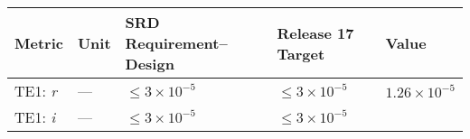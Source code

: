 \documentclass[DM,toc]{lsstdoc}
\begin{document}
\begin{longtable}[]{@{}lllll@{}}
\toprule
\begin{minipage}[b]{0.13\columnwidth}\raggedright\strut
Metric\strut
\end{minipage} & \begin{minipage}[b]{0.05\columnwidth}\raggedright\strut
Unit\strut
\end{minipage} & \begin{minipage}[b]{0.24\columnwidth}\raggedright\strut
SRD Requirement--Design\strut
\end{minipage} & \begin{minipage}[b]{0.21\columnwidth}\raggedright\strut
Release 17 Target\strut
\end{minipage} & \begin{minipage}[b]{0.22\columnwidth}\raggedright\strut
Value\strut
\end{minipage}\tabularnewline
\midrule
\endhead
\begin{minipage}[t]{0.13\columnwidth}\raggedright\strut
TE1: \emph{r}\strut
\end{minipage} & \begin{minipage}[t]{0.05\columnwidth}\raggedright\strut
---\strut
\end{minipage} & \begin{minipage}[t]{0.24\columnwidth}\raggedright\strut
\(\leq 3\times 10^{-5}\)\strut
\end{minipage} & \begin{minipage}[t]{0.21\columnwidth}\raggedright\strut
\(\leq 3\times 10^{-5}\)\strut
\end{minipage} & \begin{minipage}[t]{0.22\columnwidth}\raggedright\strut
\(1.26\times 10^{-5}\)\strut
\end{minipage}\tabularnewline
\begin{minipage}[t]{0.13\columnwidth}\raggedright\strut
TE1: \emph{i}\strut
\end{minipage} & \begin{minipage}[t]{0.05\columnwidth}\raggedright\strut
---\strut
\end{minipage} & \begin{minipage}[t]{0.24\columnwidth}\raggedright\strut
\(\leq 3\times 10^{-5}\)\strut
\end{minipage} & \begin{minipage}[t]{0.21\columnwidth}\raggedright\strut
\(\leq 3\times 10^{-5}\)\strut
\end{minipage} & \begin{minipage}[t]{0.22\columnwidth}\raggedright\strut

\end{minipage}
\end{longtable}
\end{document}
